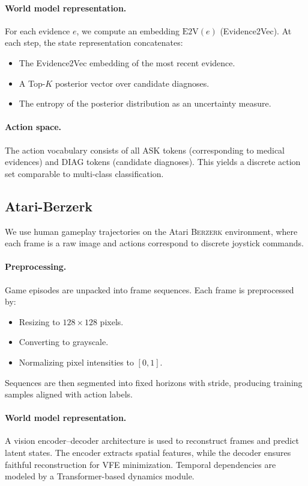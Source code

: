 \documentclass{article} %
\begin{document}
\paragraph{World model representation.}
For each evidence $e$, we compute an embedding $\mathrm{E2V}(e)$ (Evidence2Vec). At each step, the state representation concatenates:
\begin{itemize}
  \item The Evidence2Vec embedding of the most recent evidence.
  \item A Top-$K$ posterior vector over candidate diagnoses.
  \item The entropy of the posterior distribution as an uncertainty measure.
\end{itemize}

\paragraph{Action space.}
The action vocabulary consists of all ASK tokens (corresponding to medical evidences) and DIAG tokens (candidate diagnoses). This yields a discrete action set comparable to multi-class classification.

\subsection{Atari-Berzerk}
\label{Sec:B5}

We use human gameplay trajectories on the Atari \textsc{Berzerk} environment, where each frame is a raw image and actions correspond to discrete joystick commands.

\paragraph{Preprocessing.}
Game episodes are unpacked into frame sequences. Each frame is preprocessed by:
\begin{itemize}
  \item Resizing to $128\times128$ pixels.
  \item Converting to grayscale.
  \item Normalizing pixel intensities to $[0,1]$.
\end{itemize}
Sequences are then segmented into fixed horizons with stride, producing training samples aligned with action labels.

\paragraph{World model representation.}
A vision encoder–decoder architecture is used to reconstruct frames and predict latent states. The encoder extracts spatial features, while the decoder ensures faithful reconstruction for VFE minimization. Temporal dependencies are modeled by a Transformer-based dynamics module.
\end{document}
